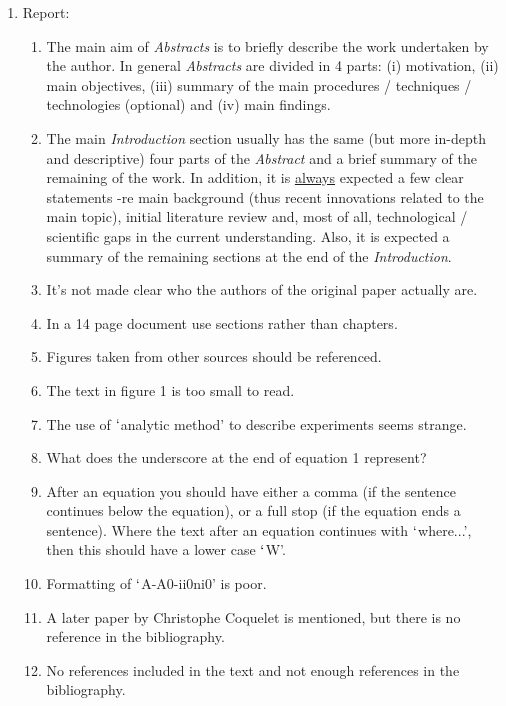 \documentclass[14pt,twoside]{report}
\begin{document}
\begin{enumerate}

\item Report:
\begin{enumerate}
%
\item The main aim of {\it Abstracts} is to briefly describe the work undertaken by the author. In general {\it Abstracts} are divided in 4 parts: (i) motivation, (ii) main objectives, (iii) summary of the main procedures / techniques / technologies (optional) and (iv) main findings. 
%
\item The main {\it Introduction} section usually has the same (but more in-depth and descriptive) four parts of the {\it Abstract} and a brief summary of the remaining of the work. In addition, it is \underline{always} expected a few clear statements -re main background (thus recent innovations related to the main topic), initial literature review and, most of all, technological / scientific gaps in the current understanding. Also, it is expected a summary of the remaining sections at the end of the {\it Introduction}.
%
\item It's not made clear who the authors of the original paper actually are.
%
\item In a 14 page document use sections rather than chapters.
%
\item Figures taken from other sources should be referenced.
%
\item The text in figure 1 is too small to read.
%
\item The use of $\lq$analytic method' to describe experiments seems strange.
%
\item What does the underscore at the end of equation 1 represent?
%
\item After an equation you should have either a comma (if the sentence continues below the equation), or a full stop (if the equation ends a sentence). Where the text after an equation continues with $\lq$where...', then this should have a lower case $\lq$W'.
%
\item Formatting of $\lq$A-A0-ii0ni0' is poor.
%
\item A later paper by Christophe Coquelet is mentioned, but there is no reference in the bibliography.
%
\item No references included in the text and not enough references in the bibliography.
%

\end{enumerate}
\end{enumerate}
\end{document}
